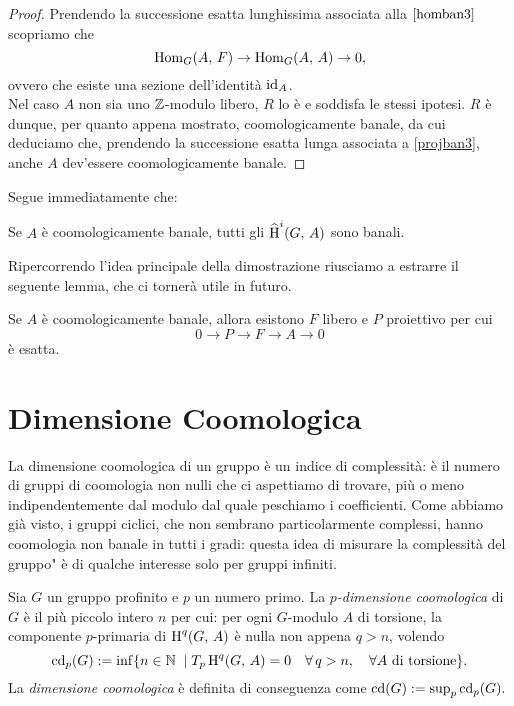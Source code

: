\begin{proof}
	Prendendo la successione esatta lunghissima associata alla $ \ref{homban3} $ scopriamo che
	\[ \operatorname{Hom}_G(A, \, F) \to \operatorname{Hom}_G(A, \, A) \to 0, \]
	ovvero che esiste una sezione dell'identità $ \operatorname{id}_A $.\\
	
	Nel caso $ A $ non sia uno $ \mathbb{Z} $-modulo libero, $ R $ lo è e soddisfa le stessi ipotesi. $ R $ è dunque, per quanto appena mostrato, coomologicamente banale, da cui deduciamo che, prendendo la successione esatta lunga associata a \ref{projban3}, anche $ A $ dev'essere coomologicamente banale.
	
\end{proof}

Segue immediatamente che:

\begin{corollary}
	Se $ A $ è coomologicamente banale, tutti gli $ \operatorname{\widehat{H}}^i(G, \, A) $ sono banali.
\end{corollary}

Ripercorrendo l'idea principale della dimostrazione riusciamo a estrarre il seguente lemma, che ci tornerà utile in futuro.

\begin{corollary}
	Se $ A $ è coomologicamente banale, allora esistono $ F $ libero e $ P $ proiettivo per cui
	\[ 0 \to P \to F \to A \to 0 \]
	è esatta.
\end{corollary}

\section{Dimensione Coomologica}
La dimensione coomologica di un gruppo è un indice di complessità: è il numero di gruppi di coomologia non nulli che ci aspettiamo di trovare, più o meno indipendentemente dal modulo dal quale peschiamo i coefficienti. Come abbiamo già visto, i gruppi ciclici, che non sembrano particolarmente complessi, hanno coomologia non banale in tutti i gradi: questa idea di \leftquote misurare la complessità del gruppo" è di qualche interesse solo per gruppi infiniti.

\begin{definition}
	Sia $ G $ un gruppo profinito e $ p $ un numero primo. La \emph{$ p $-dimensione coomologica} di $ G $ è il più piccolo intero $ n $ per cui: per ogni $ G $-modulo $ A $ di torsione, la componente $ p $-primaria di $ \operatorname{H}^q(G, \, A) $ è nulla non appena $ q > n $, volendo
	\[ \operatorname{cd}_p(G) := \inf \{ n \in \mathbb{N} \; \mid T_p\operatorname{H}^q(G, \, A)=0\quad \forall \, q > n, \quad \forall A \text{ di torsione} \}. \]
	La \emph{dimensione coomologica} è definita di conseguenza come $ \operatorname{cd}(G) := \sup_p \operatorname{cd}_p(G). $
\end{definition}

